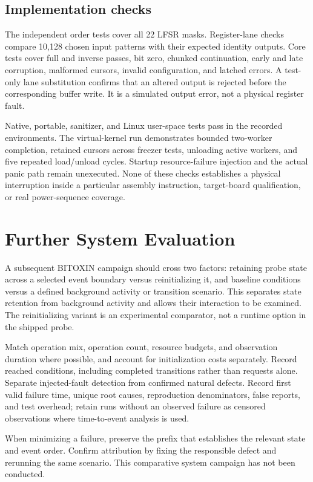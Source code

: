 \documentclass[10pt,twocolumn,letterpaper]{article}
\begin{document}
\subsection{Implementation checks}
The independent order tests cover all 22 LFSR masks. Register-lane checks compare 10,128 chosen input patterns with their expected identity outputs. Core tests cover full and inverse passes, bit zero, chunked continuation, early and late corruption, malformed cursors, invalid configuration, and latched errors. A test-only lane substitution confirms that an altered output is rejected before the corresponding buffer write. It is a simulated output error, not a physical register fault.

Native, portable, sanitizer, and Linux user-space tests pass in the recorded environments. The virtual-kernel run demonstrates bounded two-worker completion, retained cursors across freezer tests, unloading active workers, and five repeated load/unload cycles. Startup resource-failure injection and the actual panic path remain unexecuted. None of these checks establishes a physical interruption inside a particular assembly instruction, target-board qualification, or real power-sequence coverage.

\section{Further System Evaluation}
A subsequent BITOXIN campaign should cross two factors: retaining probe state across a selected event boundary versus reinitializing it, and baseline conditions versus a defined background activity or transition scenario. This separates state retention from background activity and allows their interaction to be examined. The reinitializing variant is an experimental comparator, not a runtime option in the shipped probe.

Match operation mix, operation count, resource budgets, and observation duration where possible, and account for initialization costs separately. Record reached conditions, including completed transitions rather than requests alone. Separate injected-fault detection from confirmed natural defects. Record first valid failure time, unique root causes, reproduction denominators, false reports, and test overhead; retain runs without an observed failure as censored observations where time-to-event analysis is used.

When minimizing a failure, preserve the prefix that establishes the relevant state and event order. Confirm attribution by fixing the responsible defect and rerunning the same scenario. This comparative system campaign has not been conducted.
\end{document}
